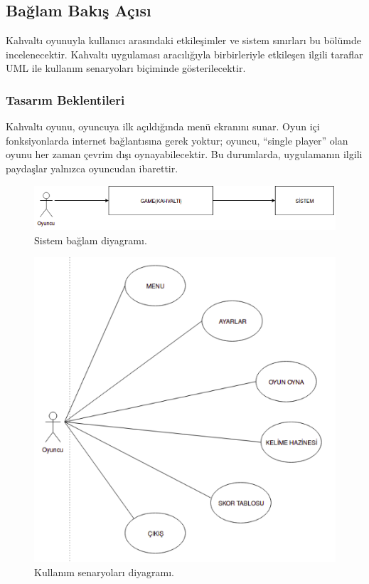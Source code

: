 \documentclass[12pt,a4paper]{article}
\begin{document}
   \subsection{Bağlam Bakış Açısı}
   Kahvaltı oyunuyla kullanıcı arasındaki etkileşimler ve sistem sınırları bu bölümde incelenecektir. Kahvaltı uygulaması aracılığıyla birbirleriyle etkileşen ilgili taraflar UML ile kullanım senaryoları biçiminde gösterilecektir.

   \subsubsection{Tasarım Beklentileri}
   Kahvaltı oyunu, oyuncuya ilk açıldığında menü ekranını sunar. Oyun içi fonksiyonlarda internet bağlantısına gerek yoktur; oyuncu, “single player” olan oyunu her zaman çevrim dışı oynayabilecektir. Bu durumlarda, uygulamanın ilgili paydaşlar yalnızca oyuncudan ibarettir.
   \begin{figure}
      \begin{center}
         \includegraphics[width=\linewidth]{img/img1.png}
         \caption{Sistem bağlam diyagramı.}
         \label{fig:bir}
      \end{center}
   \end{figure}

   \begin{figure}
      \begin{center}
            \includegraphics[width=\linewidth]{img/img2.png}
            \caption{Kullanım senaryoları diyagramı.}
            \label{fig:iki}
      \end{center}
   \end{figure}
\end{document}

